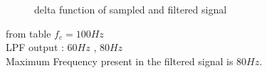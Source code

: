 \documentclass[journal,12pt,twocolumn]{IEEEtran}
\begin{document}
	
\begin{figure}
	\centering
	
	\caption{delta function of sampled and filtered signal }
\end{figure}
	from table $f_c = 100Hz$ \\
	LPF output : $60Hz$ , $80Hz$\\
	Maximum Frequency present in the filtered signal is $80Hz$.
	
	
	
	
\end{document}
